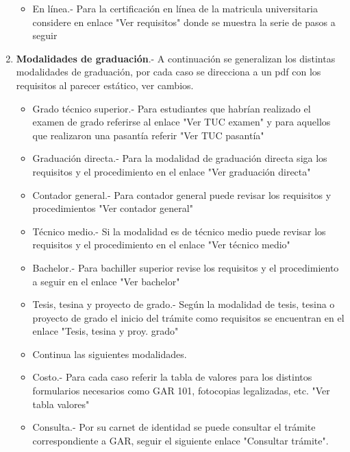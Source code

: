 \documentclass[letter, openright, 12pt]{book}
\begin{document}
\begin{enumerate}[label=(\alph*)]
\begin{itemize}
\item En línea.- Para la certificación en línea de la matricula universitaria considere en enlace "Ver requisitos" donde se muestra la serie de pasos a seguir 
\end{itemize}

\item \textbf{Modalidades de graduación}.- A continuación se generalizan los distintas modalidades de graduación, por cada caso se direcciona a un pdf con los requisitos al parecer estático, ver cambios. 
\begin{itemize}
\item Grado técnico superior.- Para estudiantes que habrían realizado el examen de grado referirse al enlace "Ver TUC examen" y para aquellos que realizaron una pasantía referir "Ver TUC pasantía"
\item Graduación directa.- Para la modalidad de graduación directa siga los requisitos y el procedimiento en el enlace "Ver graduación directa"
\item Contador general.- Para contador general puede revisar los requisitos y procedimientos "Ver contador general"
\item Técnico medio.- Si la modalidad es de técnico medio puede revisar los requisitos y el procedimiento en el enlace "Ver técnico medio"
\item Bachelor.- Para bachiller superior revise los requisitos y el procedimiento a seguir en el enlace "Ver bachelor"
\item Tesis, tesina y proyecto de grado.- Según la modalidad de tesis, tesina o proyecto de grado el inicio del trámite como requisitos se encuentran en el enlace "Tesis, tesina y proy. grado"
\item Continua las siguientes modalidades. 
\item Costo.- Para cada caso referir la tabla de valores para los distintos formularios necesarios como GAR 101, fotocopias legalizadas, etc. "Ver tabla valores"
\item Consulta.- Por su carnet de identidad se puede consultar el trámite correspondiente a GAR, seguir el siguiente enlace "Consultar trámite".
\end{itemize}


\end{enumerate}
\end{document}

